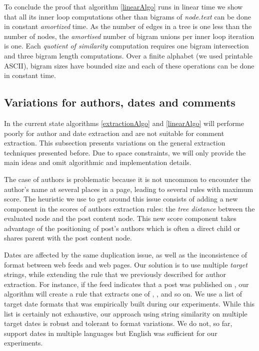 \linearAlgo

To conclude the proof that algorithm \ref{linearAlgo} runs in linear time we show that all its inner loop computations other than bigrams of \emph{node.text} can be done in constant \emph{amortized} time. As the number of edges in a tree is one less than the number of nodes, the \emph{amortised} number of bigram unions per inner loop iteration is one. Each \emph{quotient of similarity} computation requires one bigram intersection and three bigram length computations. Over a finite alphabet (we used printable ASCII), bigram sizes have bounded size and each of these operations can be done in constant time.

\subsection{Variations for authors, dates and comments}
In the current state algorithms \ref{extractionAlgo} and \ref{linearAlgo} will performe poorly for author and date extraction and are not suitable for comment extraction. This subsection presents variations on the general extraction techniques presented before. Due to space constraints, we will only provide the main ideas and omit algorithmic and implementation details.

The case of authors is problematic because it is not uncommon to encounter the author's name at several places in a page, leading to several rules with maximum score. The heuristic we use to get around this issue consists of adding a new component in the scores of authors extraction rules: the \emph{tree distance} between the evaluated node and the post content node. This new score component takes advantage of the positioning of post's authors which is often a direct child or shares parent with the post content node.

Dates are affected by the same duplication issue, as well as the inconsistence of format between web feeds and web pages. Our solution is to use multiple \emph{target} strings, while extending the rule that we previously described for author extraction. For instance, if the feed indicates that a post was published on
, our algorithm will create a rule that extracts one of , ,  and so on. We use a list of  target date formats that was empirically built during our experiments. While this list is certainly not exhaustive, our approach using string similarity on multiple target dates is robust and tolerant to format variations. We do not, so far, support dates in multiple languages but English was sufficient for our experiments.

